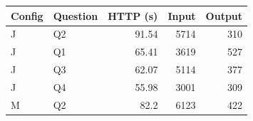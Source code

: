 \begin{tabular}{llrrr}
Config & Question & HTTP (s) & Input & Output \\
\hline
J & Q2 & 91.54 & 5714 & 310 \\
J & Q1 & 65.41 & 3619 & 527 \\
J & Q3 & 62.07 & 5114 & 377 \\
J & Q4 & 55.98 & 3001 & 309 \\
M & Q2 & 82.2 & 6123 & 422 \\
\end{tabular}
